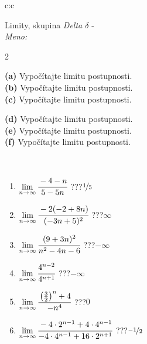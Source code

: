 \documentclass[10pt]{report}
\begin{document}
\newpage
\thispagestyle{empty}
\begin{tabular}{c:c}
\begin{minipage}[c][104.5mm][t]{0.5\linewidth}
\begin{center}
\vspace{5mm}
{\huge Limity, skupina \textit{Delta $\delta$} -}\\[5mm]
\textit{Meno:}\phantom{xxxxxxxxxxxxxxxxxxxxxxxxxxxxxxxxxxxxxxxxxxxxxxxxxxxxxxxxxxxxxxxxx}\\[5mm]
\begin{minipage}{0.95\linewidth}
\begin{center}
{\small \begin{multicols}{2} \raggedright
\textbf{(a)} Vypočítajte limitu postupnosti. \\[1mm]
\textbf{(b)} Vypočítajte limitu postupnosti. \\[1mm]
\textbf{(c)} Vypočítajte limitu postupnosti. \par \columnbreak
\textbf{(d)} Vypočítajte limitu postupnosti. \\[1mm]
\textbf{(e)} Vypočítajte limitu postupnosti. \\[1mm]
\textbf{(f)} Vypočítajte limitu postupnosti.
\end{multicols}
}
\end{center}
\end{minipage}
\\[1mm]
\begin{minipage}{0.79\linewidth}
\begin{center}
\begin{varwidth}{\linewidth}
\setlength{\itemsep}{0pt}
\begin{enumerate}
\footnotesizerr
\item $\lim\limits_{n\to\infty}\cfrac{-4-n}{5-5n}$\quad \dotfill\; ???\;\dotfill \quad $\nicefrac{1}{5}$
\item $\lim\limits_{n\to\infty}\cfrac{-2(-2+8n)}{(-3n+5)^2}$\quad \dotfill\; ???\;\dotfill \quad $\infty$
\item $\lim\limits_{n\to\infty}\cfrac{(9+3n)^2}{n^2-4n-6}$\quad \dotfill\; ???\;\dotfill \quad $-\infty$
\item $\lim\limits_{n\to\infty}\cfrac{4^{n-2}}{4^{n+1}}$\quad \dotfill\; ???\;\dotfill \quad $-\infty$
\item $\lim\limits_{n\to\infty}\cfrac{\left(\frac{3}{2}\right)^n +4}{-n^{4}}$\quad \dotfill\; ???\;\dotfill \quad $0$
\item $\lim\limits_{n\to\infty}\cfrac{-4\cdot 2^{n-1}+4\cdot 4^{n-1}}{-4\cdot 4^{n-1}+16\cdot 2^{n+1}}$\quad \dotfill\; ???\;\dotfill \quad $\nicefrac{-1}{2}$

\end{enumerate}
\end{varwidth}
\end{center}
\end{minipage}
\end{center}
\end{minipage}
\end{tabular}
\end{document}
